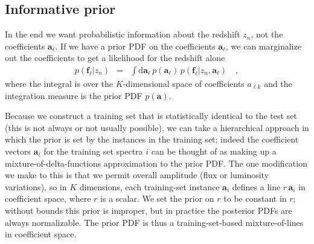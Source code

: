 \documentclass[preprint]{aastex}
\newcommand{\mmatrix}[1]{\boldsymbol{#1}}
\newcommand{\avec}{\mmatrix{a}}
\newcommand{\fvec}{\mmatrix{f}}
\newcommand{\dd}{\mathrm{d}}
\begin{document}
\subsection{Informative prior}

In the end we want probabilistic information about the redshift $z_n$,
not the coefficients $\avec_\ell$.  If we have a prior PDF on the
coefficients $\avec_\ell$, we can marginalize out the coefficients to
get a likelihood for the redshift alone
\begin{eqnarray}\displaystyle
p(\fvec_\ell|z_n) &=& \int \dd\avec_\ell\,p(\avec_\ell)\,p(\fvec_\ell|z_n,\avec_\ell)
\quad ,
\end{eqnarray}
where the integral is over the $K$-dimensional space of coefficients
$a_{\ell k}$ and the integration measure is the prior PDF $p(\avec)$.

Because we construct a training set that is statistically identical to
the test set (this is not always or not usually possible), we can take
a hierarchical approach in which the prior is set by the instances in
the training set; indeed the coefficient vectors $\avec_i$ for the
training set spectra $i$ can be thought of as making up a
mixture-of-delta-functions approximation to the prior PDF.  The one
modification we make to this is that we permit overall amplitude (flux
or luminosity variations), so in $K$ dimensions, each training-set
instance $\avec_i$ defines a line $r\,\avec_i$ in coefficient space,
where $r$ is a scalar.  We set the prior on $r$ to be constant in $r$;
without bounds this prior is improper, but in practice the posterior
PDFs are always normalizable.  The prior PDF is thus a
training-set-based mixture-of-lines in coefficient space.
\end{document}
